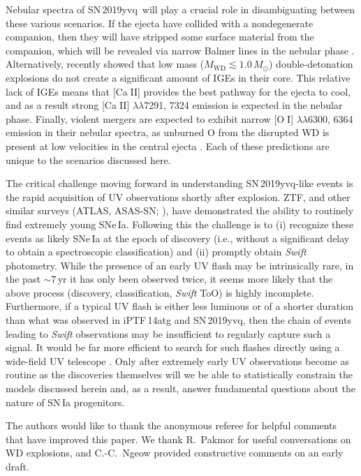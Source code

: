 \documentclass[twocolumn]{aastex63}
\def\ion#1#2{#1$\;${\footnotesize\rm{#2}}\relax}
\newcommand{\sn}{SN\,2019yvq}
\begin{document}
Nebular spectra of \sn\ will play a crucial role in disambiguating between
these various scenarios. If the ejecta have collided with a nondegenerate
companion, then they will have stripped some surface material from the
companion, which will be revealed via narrow Balmer lines in the nebular phase
\citep[e.g.,][]{Wheeler75}. Alternatively, \citet{Polin19a} recently showed
that low mass ($M_\mathrm{WD} \lesssim 1.0\,M_\odot$) double-detonation
explosions do not create a significant amount of IGEs in their core. This
relative lack of IGEs means that [\ion{Ca}{II}] provides the best pathway for
the ejecta to cool, and as a result strong [\ion{Ca}{II}]
$\lambda\lambda$7291, 7324 emission is expected in the nebular phase. Finally,
violent mergers are expected to exhibit narrow [\ion{O}{I}]
$\lambda\lambda$6300, 6364 emission in their nebular spectra, as unburned O
from the disrupted WD is present at low velocities in the central ejecta
\citep{Taubenberger13,Kromer16}. Each of these predictions are unique to the
scenarios discussed here.

The critical challenge moving forward in understanding \sn-like events is the
rapid acquisition of UV observations shortly after explosion. ZTF, and other
similar surveys (ATLAS, ASAS-SN; \citealt{Tonry11,Holoien17}), have
demonstrated the ability to routinely find extremely young SNe\,Ia. Following
this the challenge is to (i) recognize these events as likely SNe\,Ia at the
epoch of discovery (i.e., without a significant delay to obtain a
spectroscopic classification) and (ii) promptly obtain \textit{Swift}
photometry. While the presence of an early UV flash may be intrinsically rare,
in the past $\sim$7\,yr it has only been observed twice, it seems more likely
that the above process (discovery, classification, \textit{Swift} ToO) is
highly incomplete. Furthermore, if a typical UV flash is either less luminous
or of a shorter duration than what was observed in iPTF\,14atg and \sn, then
the chain of events leading to \textit{Swift} observations may be insufficient
to regularly capture such a signal. It would be far more efficient to search
for such flashes directly using a wide-field UV telescope
\citep[e.g.,][]{Sagiv14}. Only after extremely early UV observations become as
routine as the discoveries themselves will we be able to statistically
constrain the models discussed herein and, as a result, answer fundamental
questions about the nature of SN\,Ia progenitors.


\acknowledgements

The authors would like to thank the anonymous referee for helpful comments
that have improved this paper. We thank R.~Pakmor for useful conversations on
WD explosions, and C.-C.~Ngeow provided constructive comments on an early
draft.
\end{document}
